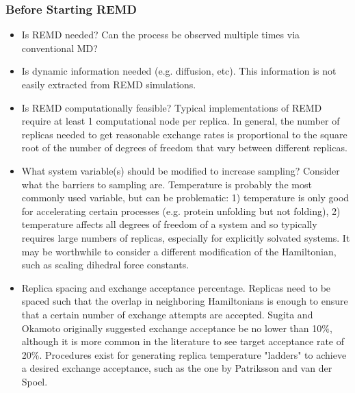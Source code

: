 \subsubsection{Before Starting REMD}
\begin{itemize}
  \item Is REMD needed? Can the process be observed multiple times via conventional MD?
  \item Is dynamic information needed (e.g. diffusion, etc). This information is not easily extracted from REMD simulations.
  \item Is REMD computationally feasible? Typical implementations of REMD require at least 1 computational node per replica. In general, the number of replicas needed to get reasonable exchange rates is proportional to the square root of the number of degrees of freedom that vary between different replicas.
  \item What system variable(s) should be modified to increase sampling? Consider what the barriers to sampling are. Temperature is probably the most commonly used variable, but can be problematic: 1) temperature is only good for accelerating certain processes (e.g. protein unfolding but not folding), 2) temperature affects all degrees of freedom of a system and so typically requires large numbers of replicas, especially for explicitly solvated systems. It may be worthwhile to consider a different modification of the Hamiltonian, such as scaling dihedral force constants.
  \item Replica spacing and exchange acceptance percentage. Replicas need to be spaced such that the overlap in neighboring Hamiltonians is enough to ensure that a certain number of exchange attempts are accepted. Sugita and Okamoto\citep{Sugita1999} originally suggested exchange acceptance be no lower than 10\%, although it is more common in the literature to see target acceptance rate of 20\%. Procedures exist for generating replica temperature "ladders" to achieve a desired exchange acceptance, such as the one by Patriksson and van der Spoel.\citep{Patriksson2008}
\end{itemize}

